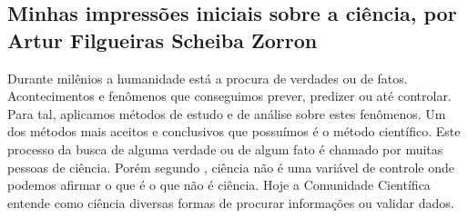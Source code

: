 \subsection{Minhas impressões iniciais sobre a ciência, por Artur Filgueiras Scheiba Zorron}

Durante milênios a humanidade está a procura de verdades ou de fatos. Acontecimentos e fenômenos que conseguimos prever, predizer ou até controlar. Para tal, aplicamos métodos de estudo e de análise sobre estes fenômenos. Um dos métodos mais aceitos e conclusivos que possuímos é o método científico. Este processo da busca de alguma verdade ou de algum fato é chamado por muitas pessoas de ciência. Porém segundo \citep{schwartzman_ciencia_1984}, ciência não é uma variável de controle onde podemos afirmar o que é o que não é ciência. Hoje a \gls{Comunidade Científica} entende como ciência diversas formas de procurar informações ou validar dados.